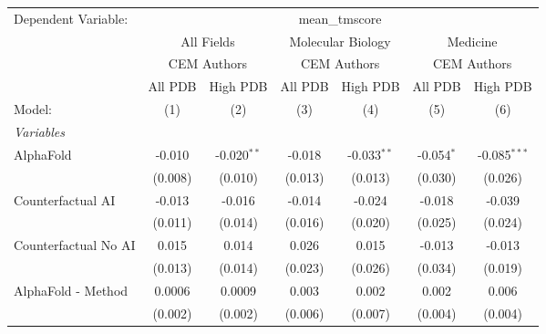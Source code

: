 \begingroup
\centering
\begin{tabular}{lcccccc}
   \tabularnewline \midrule \midrule
   Dependent Variable: & \multicolumn{6}{c}{mean\_tmscore}\\
 & \multicolumn{2}{c}{All Fields} & \multicolumn{2}{c}{Molecular Biology} & \multicolumn{2}{c}{Medicine} \\
\cmidrule(lr){2-3} \cmidrule(lr){4-5} \cmidrule(lr){6-7}
 & \multicolumn{2}{c}{CEM Authors} & \multicolumn{2}{c}{CEM Authors} & \multicolumn{2}{c}{CEM Authors} \\
\cmidrule(lr){2-3} \cmidrule(lr){4-5} \cmidrule(lr){6-7}
 & \multicolumn{1}{c}{All PDB} & \multicolumn{1}{c}{High PDB} & \multicolumn{1}{c}{All PDB} & \multicolumn{1}{c}{High PDB} & \multicolumn{1}{c}{All PDB} & \multicolumn{1}{c}{High PDB} \\
\cmidrule(lr){2-2} \cmidrule(lr){3-3} \cmidrule(lr){4-4} \cmidrule(lr){5-5} \cmidrule(lr){6-6} \cmidrule(lr){7-7}
   Model:                                                     & (1)      & (2)           & (3)      & (4)           & (5)          & (6)\\  
   \midrule
   \emph{Variables}\\
   AlphaFold                                                  & -0.010   & -0.020$^{**}$ & -0.018   & -0.033$^{**}$ & -0.054$^{*}$ & -0.085$^{***}$\\   
                                                              & (0.008)  & (0.010)       & (0.013)  & (0.013)       & (0.030)      & (0.026)\\   
   Counterfactual AI                                          & -0.013   & -0.016        & -0.014   & -0.024        & -0.018       & -0.039\\   
                                                              & (0.011)  & (0.014)       & (0.016)  & (0.020)       & (0.025)      & (0.024)\\   
   Counterfactual No AI                                       & 0.015    & 0.014         & 0.026    & 0.015         & -0.013       & -0.013\\   
                                                              & (0.013)  & (0.014)       & (0.023)  & (0.026)       & (0.034)      & (0.019)\\   
   AlphaFold - Method                                         & 0.0006   & 0.0009        & 0.003    & 0.002         & 0.002        & 0.006\\   
                                                              & (0.002)  & (0.002)       & (0.006)  & (0.007)       & (0.004)      & (0.004)\\   

\end{tabular}
